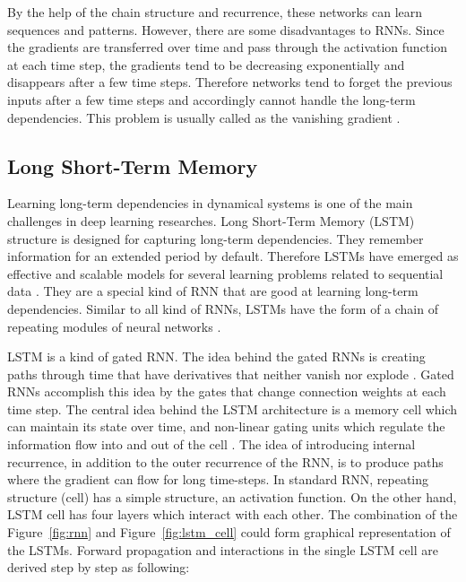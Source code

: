 By the help of the chain structure and recurrence, these networks can learn sequences and patterns.
However, there are some disadvantages to RNNs. 
Since the gradients are transferred over time and pass through the activation function at each time step, the gradients tend to be decreasing exponentially and disappears after a few time steps. Therefore networks tend to forget the previous inputs after a few time steps and accordingly cannot handle the long-term dependencies.
This problem is usually called as the vanishing gradient \cite{hochreiter1998vanishing}.

\subsection{Long Short-Term Memory}

Learning long-term dependencies in dynamical systems is one of the main challenges in deep learning researches.
Long Short-Term Memory (LSTM) structure is designed for capturing long-term dependencies. 
They remember information for an extended period by default.
Therefore LSTMs have emerged as effective and scalable models for several learning problems related to sequential data \cite{hochreiter1997long}. They are a special kind of RNN that are good at learning long-term dependencies. 
Similar to all kind of RNNs, LSTMs have the form of a chain of repeating modules of neural networks \cite{olah2015understanding}. 

LSTM is a kind of gated RNN. The idea behind the gated RNNs is creating paths through time that have derivatives that neither vanish nor explode \cite{goodfellow2016deep}. Gated RNNs accomplish this idea by the gates that change connection weights at each time step. The central idea behind the LSTM architecture is a memory cell which can maintain its state over time, and non-linear gating units which regulate the information flow into and out of the cell \cite{greff2017lstm}.
The idea of introducing internal recurrence, in addition to the outer recurrence of the RNN, is to produce paths where the gradient can flow for long time-steps.
In standard RNN, repeating structure (cell) has a simple structure, an activation function. On the other hand, LSTM cell has four layers which interact with each other.
The combination of the Figure~\ref{fig:rnn} and Figure~\ref{fig:lstm_cell} could form graphical representation of the LSTMs.
Forward propagation and interactions in the single LSTM cell are derived step by step as following:

